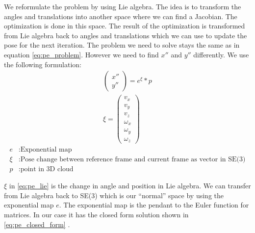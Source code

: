 \documentclass[11pt,a4paper,titlepage,oneside]{report}
\begin{document}
We reformulate the problem by using Lie algebra. The idea is to transform the angles and translations into another space where we can find a Jacobian. The optimization is done in this space. The result of the optimization is transformed from Lie algebra back to angles and translations which we can use to update the pose for the next iteration. The problem we need to solve stays the same as in equation \ref{eq:pe_problem}. However we need to find $x''$ and $y''$ differently. We use the following formulation:
\begin{equation}\label{eq:pe_lie}
  \begin{gathered}
    \begin{pmatrix}
      x''\\
      y''
    \end{pmatrix}
    =e^{\xi}*p\\
    \xi=\begin{pmatrix}
      v_x\\
      v_y\\
      v_z\\
      \omega_x\\
      \omega_y\\
      \omega_z
    \end{pmatrix}
  \end{gathered}
\end{equation}
\begin{align*}
  e      &:  \text{Exponential map}\\
  \xi    &:  \text{Pose change between reference frame and current frame as vector in SE(3)}\\
  p      &:  \text{point in 3D cloud}
\end{align*}

$\xi$ in \ref{eq:pe_lie} is the change in angle and position in Lie algebra. We can transfer from Lie algebra back to SE(3) which is our ``normal'' space by using the exponential map $e$. The exponential map is the pendant to the Euler function for matrices. In our case it has the closed form solution shown in \ref{eq:pe_closed_form} \cite{rvc}.
\end{document}
